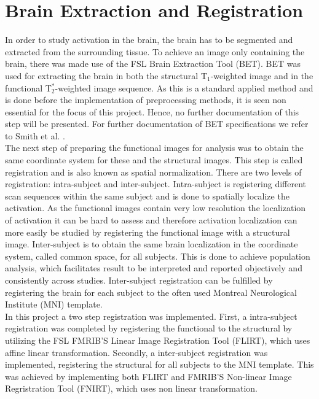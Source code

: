 \section{Brain Extraction and Registration} \label{BET}

In order to study activation in the brain, the brain has to be segmented and extracted from the surrounding tissue. To achieve an image only containing the brain, there was made use of the FSL Brain Extraction Tool (BET).  BET was used for extracting the brain in both the structural T$_1$-weighted image and in the functional T$_{2}^*$-weighted image sequence. As this is a standard applied method and is done before the implementation of preprocessing methods, it is seen non essential for the focus of this project. Hence, no further documentation of this step will be presented. For further documentation of BET specifications we refer to Smith et al. \cite{Smith2002}.    \\
The next step of preparing the functional images for analysis was to obtain the same coordinate system for these and the structural images. This step is called registration and is also known as spatial normalization. There are two levels of registration: intra-subject and inter-subject. Intra-subject is registering different scan sequences within the same subject and is done to spatially localize the activation. As the functional images contain very low resolution the localization of activation it can be hard to assess and therefore activation localization can more easily be studied by registering the functional image with a structural image. Inter-subject is to obtain the same brain localization in the coordinate system, called common space, for all subjects. This is done to achieve population analysis, which facilitates result to be interpreted and reported objectively and consistently across studies. Inter-subject registration can be fulfilled by registering the brain for each subject to the often used Montreal Neurological Institute (MNI) template. \cite{Hajnal2001} \\
In this project a two step registration was implemented. First, a intra-subject registration was completed by registering the functional to the structural by utilizing the FSL FMRIB'S Linear Image Registration Tool (FLIRT), which uses affine linear transformation. \cite{Jenkinson2001} Secondly, a inter-subject registration was implemented, registering the structural for all subjects to the MNI template. This was achieved by implementing both FLIRT and FMRIB'S Non-linear Image Regristration Tool (FNIRT), which uses non linear transformation. \cite{Andersson2007}   

